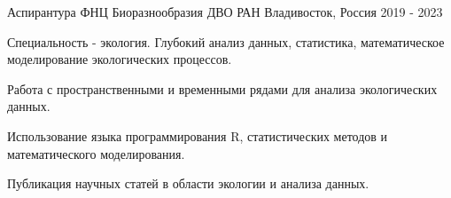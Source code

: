 

\begin{cventries}

  
  \cventry
    {Аспирантура} %
    {ФНЦ Биоразнообразия ДВО РАН} %
    {Владивосток, Россия} %
    {2019 - 2023} %
    {
      \begin{cvitems}
        \item {Специальность - экология. Глубокий анализ данных, статистика, математическое моделирование экологических процессов.}
        \item {Работа с пространственными и временными рядами для анализа экологических данных.}
        \item {Использование языка программирования R, статистических методов и математического моделирования.}
        \item {Публикация научных статей в области экологии и анализа данных.}
      \end{cvitems}
    }

\end{cventries}



